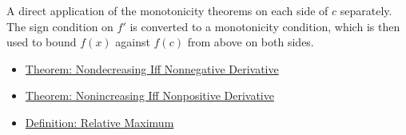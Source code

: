 \begin{remark*}
A direct application of the monotonicity theorems on each side of $c$ separately. The sign condition on $f'$ is converted to a monotonicity condition, which is then used to bound $f(x)$ against $f(c)$ from above on both sides.
\end{remark*}

\begin{dependencies}
\begin{itemize}
  \item \hyperref[thm:nondecreasing-iff-nonneg-derivative]{Theorem: Nondecreasing Iff Nonneg\-ative Derivative}
  \item \hyperref[thm:nonincreasing-iff-nonpos-derivative]{Theorem: Nonincreasing Iff Nonpos\-itive Derivative}
  \item \hyperref[def:relative-maximum]{Definition: Relative Maximum}
\end{itemize}
\end{dependencies}

\clearpage
